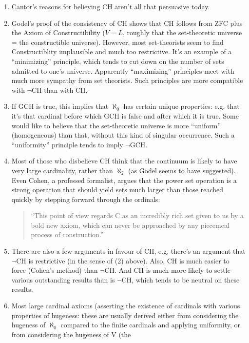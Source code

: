 \begin{enumerate}
\item Cantor's reasons for believing CH aren't all that persuasive today.
\item Godel's proof of the consistency of CH shows that CH follows from
    ZFC plus the Axiom of Constructibility ($V=L$, roughly that the set-theoretic
    universe = the constructible universe).  However, most set-theorists
    seem to find Constructiblity implausible and much too restrictive.  It's
    an example of a ``minimizing'' principle, which tends to cut down on
    the number of sets admitted to one's universe.  Apparently ``maximizing''
    principles meet with much more sympathy from set theorists.  Such
    principles are more compatible with $\neg$CH than with CH.
\item If GCH is true, this implies that $\aleph_0$ has certain unique properties:
    e.g. that it's that cardinal before which GCH is false and after which
    it is true.  Some would like to believe that the set-theoretic universe
    is more ``uniform'' (homogeneous) than that, without this kind of
    singular occurrence.  Such a ``uniformity'' principle tends to imply $\neg$GCH.
\item Most of those who disbelieve CH think that the continuum is likely to
    have very large cardinality, rather than $\aleph_2$ (as Godel seems to
    have suggested).  Even Cohen, a professed formalist, argues that the
    power set operation is a strong operation that should yield sets
    much larger than those reached quickly by stepping forward through the
    ordinals:
\begin{quote}
      ``This point of view regards C as an incredibly rich set given to us
       by a bold new axiom, which can never be approached by any piecemeal
       process of construction.''
\end{quote}
\item There are also a few arguments in favour of CH, e.g. there's an argument
    that $\neg$CH is restrictive (in the sense of (2) above).  Also, CH is
    much easier to force (Cohen's method) than $\neg$CH.  And CH is much more
    likely to settle various outstanding results than is $\neg$CH, which tends
    to be neutral on these results.
\item Most large cardinal axioms (asserting the existence of cardinals with
    various properties of hugeness: these are usually derived either from
    considering the hugeness of $\aleph_0$ compared to the finite cardinals
    and applying uniformity, or from considering the hugeness of V (the

\end{enumerate}
